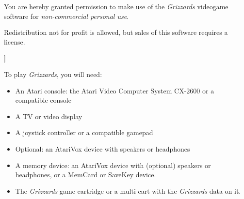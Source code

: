 \documentclass[10pt,twocolumn,openany,article]{memoir}
\begin{document}
\bigskip

You are hereby granted permission  to make use of the \textit{Grizzards}
videogame software for \emph{non-commercial personal use}.

Redistribution not for profit is allowed, but sales of this software
requires a license.

\fi

]

\let\cleardoublepage\clearpage

\mainmatter

\tableofcontents


To play \textit{Grizzards}, you will need:

\vspace{12pt}

\begin{itemize}
\item  An Atari  console: the  Atari  Video Computer  System CX-2600  or
  a compatible console
\item A TV or video display
\item A joystick controller or a compatible gamepad
  \ifdefined\ATARIAGESAVE
  \item Optional: an AtariVox device with speakers or headphones
  \else
  \ifdefined\NOSAVE\else
\item A  memory device: an  AtariVox device with (optional)  speakers or
  headphones, or a MemCard or SaveKey device.
  \fi\fi
\item The \textit{Grizzards} game cartridge \ifdefined\ATARIAGESAVE\else
  or a multi-cart with the \textit{Grizzards} data on it. \fi
\end{itemize}
\end{document}
